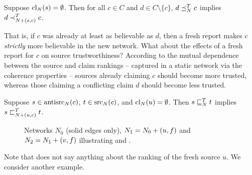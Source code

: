 \begin{axiom}[\freshposresp{}]
    Suppose $\operatorname{cl}_N(s) = \emptyset$. Then for all $c \in C$ and $d \in C
    \setminus \{c\}$, $d \preceq_N^T c$ implies $d \prec_{{N} + ({s}, {c})}^T c$.
\end{axiom}

That is, if $c$ was already at least as believable as $d$, then a fresh report
makes $c$ \emph{strictly} more believable in the new network.\footnotemark{}
%
What about the effects of a fresh report for $c$ on source trustworthiness?
According to the mutual dependence between the source and claim rankings --
captured in a static network via the coherence properties -- sources already
claiming $c$ should become more trusted, whereas those claiming a conflicting
claim $d$ should become less trusted.


\begin{axiom}[\sourceposresp{}]
    Suppose $s \in \operatorname{antisrc}_N(c)$, $t \in \operatorname{src}_N(c)$, and $\operatorname{cl}_N(u) =
    \emptyset$. Then $s \sqsubseteq_N^T t$ implies $s \sqsubset_{{N} + ({u}, {c})}^T t$.
\end{axiom}

\begin{figure}
    \centering
    \caption{
        Networks $N_0$ (solid edges only), $N_1 = {N_0} + ({u}, {f})$ and
        $N_2 = {N_1} + ({v}, {f})$ illustrating \freshposresp{} and
        \sourceposresp{}.
    }
    \label{td_new_fig_sourceposresp_example}
\end{figure}

Note that \sourceposresp{} does not say anything about the ranking of the fresh
source $u$. We consider another example.

